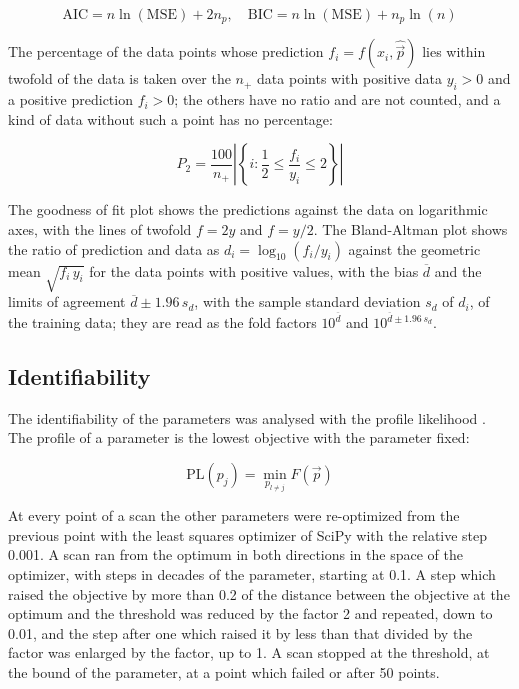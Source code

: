 \begin{equation}
\mathrm{AIC} = n \ln(\mathrm{MSE}) + 2 n_p, \quad \mathrm{BIC} = n \ln(\mathrm{MSE}) + n_p \ln(n)
\end{equation}

The percentage of the data points whose prediction $f_i = f(x_i, \hat{\vec{p}})$ lies within twofold of the data is taken over the $n_+$ data points with positive data $y_i > 0$ and a positive prediction $f_i > 0$; the others have no ratio and are not counted, and a kind of data without such a point has no percentage:

\begin{equation}
P_2 = \frac{100}{n_+} \left|\left\{ i : \frac{1}{2} \le \frac{f_i}{y_i} \le 2 \right\}\right|
\end{equation}

The goodness of fit plot shows the predictions against the data on logarithmic axes, with the lines of twofold $f = 2y$ and $f = y/2$. The Bland-Altman plot \cite{Bland1986} shows the ratio of prediction and data as $d_i = \log_{10}(f_i / y_i)$ against the geometric mean $\sqrt{f_i\, y_i}$ for the data points with positive values, with the bias $\overline{d}$ and the limits of agreement $\overline{d} \pm 1.96\, s_d$, with the sample standard deviation $s_d$ of $d_i$, of the training data; they are read as the fold factors $10^{\overline{d}}$ and $10^{\overline{d} \pm 1.96\, s_d}$.

\subsection{Identifiability}

The identifiability of the parameters was analysed with the profile likelihood \cite{Raue2009,Kreutz2013}. The profile of a parameter is the lowest objective with the parameter fixed:

\begin{equation}
\mathrm{PL}(p_j) = \min_{p_{l \neq j}} F(\vec{p})
\end{equation}

At every point of a scan the other parameters were re-optimized from the previous point with the least squares optimizer of SciPy with the relative step 0.001. A scan ran from the optimum in both directions in the space of the optimizer, with steps in decades of the parameter, starting at 0.1. A step which raised the objective by more than 0.2 of the distance between the objective at the optimum and the threshold was reduced by the factor 2 and repeated, down to 0.01, and the step after one which raised it by less than that divided by the factor was enlarged by the factor, up to 1. A scan stopped at the threshold, at the bound of the parameter, at a point which failed or after 50 points.

